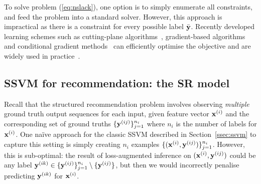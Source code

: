 To solve problem (\ref{eq:nslack}), one option is to simply enumerate all constraints, and feed the problem into a standard solver.
However, this approach is impractical as there is a constraint for every possible label $\bar{\mathbf{y}}$.
Recently developed learning schemes such as 
cutting-plane algorithms~\cite{joachims2009predicting}, %
gradient-based algorithms~\cite{ratliff2006subgradient} %
and conditional gradient methods~\cite{lacoste2013block} %
can efficiently optimise the objective and are widely used in practice~\cite{muller2014methods}.

\secmoveup
\subsection{SSVM for recommendation: the SR model}
\label{ssec:sr}
\textmoveup

Recall that the structured recommendation problem
involves observing \emph{multiple} ground truth output sequences for each input, \ie
given feature vector $\mathbf{x}^{(i)}$ and the corresponding set of ground truths $\{\mathbf{y}^{(ij)}\}_{j=1}^{n_i}$
where $n_i$ is the number of labels for $\mathbf{x}^{(i)}$.
One na\"{i}ve approach for the classic SSVM described in Section~\ref{ssec:ssvm} to capture this setting is simply creating 
$n_i$ examples $\{(\mathbf{x}^{(i)}, \mathbf{y}^{(ij)})\}_{j=1}^{n_i}$. 
However, this is sub-optimal:
the result of loss-augmented inference on $(\mathbf{x}^{(i)}, \mathbf{y}^{(ij)})$ could be any label $\mathbf{y}^{(ik)} \in \{\mathbf{y}^{(ij)}\}_{j=1}^{n_i} \setminus \{\mathbf{y}^{(ij)}\}$,
but then we would incorrectly penalise predicting $\mathbf{y}^{(ik)}$ for $\mathbf{x}^{(i)}$. 


